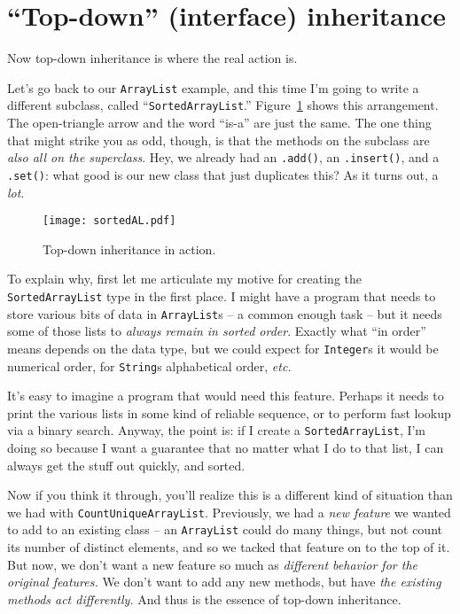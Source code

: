 \section{``Top-down'' (interface) inheritance}

Now top-down inheritance is where the real action is.

Let's go back to our \texttt{ArrayList} example, and this time I'm going to
write a different subclass, called ``\texttt{SortedArrayList}.''
Figure~\ref{fig:sortedAL} shows this arrangement. The open-triangle arrow and
the word ``is-a'' are just the same. The one thing that might strike you as
odd, though, is that the methods on the subclass are \textit{also all on the
superclass}. Hey, we already had an \texttt{.add()}, an \texttt{.insert()},
and a \texttt{.set()}: what good is our new class that just duplicates this?
As it turns out, a \textit{lot}.

\begin{figure}
\centering
\texttt{[image: sortedAL.pdf]}
\caption{Top-down inheritance in action.}
\label{fig:sortedAL}
\end{figure}

To explain why, first let me articulate my motive for creating the
\texttt{SortedArrayList} type in the first place. I might have a program that
needs to store various bits of data in \texttt{ArrayList}s -- a common enough
task -- but it needs some of those lists to \textit{always remain in sorted
order}. Exactly what ``in order'' means depends on the data type, but we could
expect for \texttt{Integer}s it would be numerical order, for \texttt{String}s
alphabetical order, \textit{etc.}

It's easy to imagine a program that would need this feature. Perhaps it needs
to print the various lists in some kind of reliable sequence, or to perform
fast lookup via a binary search. Anyway, the point is: if I create a
\texttt{SortedArrayList}, I'm doing so because I want a guarantee that no
matter what I do to that list, I can always get the stuff out quickly, and
sorted.

Now if you think it through, you'll realize this is a different kind of
situation than we had with \texttt{CountUniqueArrayList}. Previously, we had a
\textit{new feature} we wanted to add to an existing class -- an
\texttt{ArrayList} could do many things, but not count its number of distinct
elements, and so we tacked that feature on to the top of it. But now, we don't
want a new feature so much as \textit{different behavior for the original
features.} We don't want to add any new methods, but have \textit{the existing
methods act differently.} And thus is the essence of top-down inheritance.

